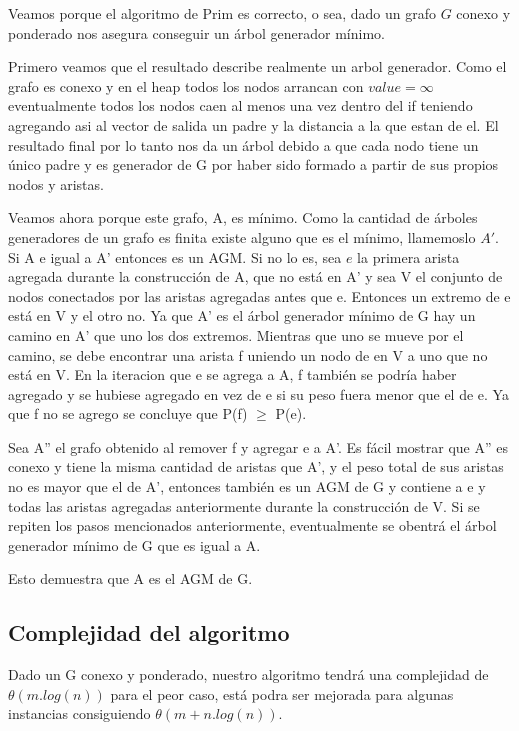 Veamos porque el algoritmo de Prim es correcto, o sea, dado un grafo $G$ conexo y ponderado nos asegura conseguir un árbol generador mínimo.

Primero veamos que el resultado describe realmente un arbol generador. Como el grafo es conexo y en el heap todos los nodos arrancan con $value = \infty$ eventualmente todos los nodos caen al menos una vez dentro del if teniendo agregando asi al vector de salida un padre y la distancia a la que estan de el. El resultado final por lo tanto nos da un árbol debido a que cada nodo tiene un único padre y es generador de G por haber sido formado a partir de sus propios nodos y aristas.

Veamos ahora porque este grafo, A, es mínimo. Como la cantidad de árboles generadores de un grafo es finita existe alguno que es el mínimo, llamemoslo $A'$. Si A e igual a A' entonces es un AGM. Si no lo es, sea $e$ la primera arista agregada durante la construcción de A, que no está en A' y sea V el conjunto de nodos conectados por las aristas agregadas antes que e. Entonces un extremo de e está en V y el otro no. Ya que A' es el árbol generador mínimo de G hay un camino en A' que uno los dos extremos. Mientras que uno se mueve por el camino, se debe encontrar una arista f uniendo un nodo de en V a uno que no está en V. En la iteracion que e se agrega a A, f también se podría haber agregado y se hubiese agregado en vez de e si su peso fuera menor que el de e. Ya que f no se agrego se concluye que P(f) $\geq$ P(e).

Sea A'' el grafo obtenido al remover f y agregar e a A'. Es fácil mostrar que A'' es conexo y tiene la misma cantidad de aristas que A', y el peso total de sus aristas no es mayor que el de A', entonces también es un AGM de G y contiene a e y todas las aristas agregadas anteriormente durante la construcción de V. Si se repiten los pasos mencionados anteriormente, eventualmente se obentrá el árbol generador mínimo de G que es igual a A.

Esto demuestra que A es el AGM de G.


\subsection{Complejidad del algoritmo}

Dado un G conexo y ponderado, nuestro algoritmo tendrá una complejidad de $\theta(m.log(n))$ para el peor caso, está podra ser mejorada para algunas instancias consiguiendo $\theta(m + n.log(n))$.

